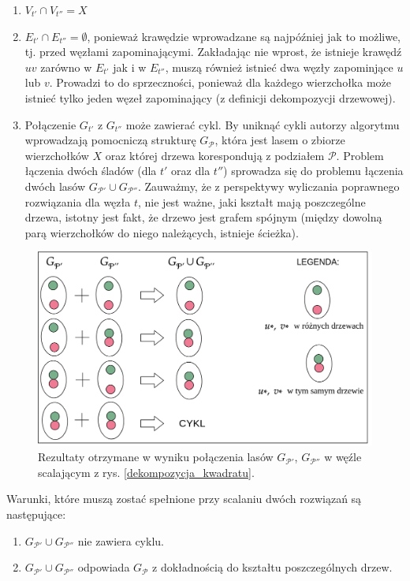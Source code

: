 \documentclass[12pt, oneside]{report}
\begin{document}
\begin{enumerate}[label=(\alph*)]
\item $V_{t'} \cap V_{t''} = X$
\item $E_{t'} \cap E_{t''} = \emptyset$, ponieważ krawędzie wprowadzane są najpóźniej jak to możliwe, tj. przed węzłami zapominającymi. Zakładając nie wprost, że istnieje krawędź $uv$ zarówno w $E_{t'}$ jak i w $E_{t''}$, muszą również istnieć dwa węzły zapominjące $u$ lub $v$. Prowadzi to do sprzeczności, ponieważ dla każdego wierzchołka może istnieć tylko jeden węzeł zapominający (z definicji dekompozycji drzewowej).
\item Połączenie $G_{t'}$ z $G_{t''}$ może zawierać cykl. By uniknąć cykli autorzy algorytmu wprowadzają pomocniczą strukturę $G_{\mathcal{P}}$, która jest lasem o zbiorze wierzchołków $X$ oraz której drzewa korespondują z podziałem $\mathcal{P}$. Problem łączenia dwóch śladów (dla $t'$ oraz dla $t''$) sprowadza się do problemu łączenia dwóch lasów $G_{\mathcal{P}'} \cup G_{\mathcal{P}''}$. Zauważmy, że z perspektywy wyliczania poprawnego rozwiązania dla węzła $t$, nie jest ważne, jaki kształt mają poszczególne drzewa, istotny jest fakt, że drzewo jest grafem spójnym (między dowolną parą wierzchołków do niego należących, istnieje ścieżka).
\end{enumerate}

\begin{figure}
\centering
\includegraphics[width=16cm]{find_n_union.png}
\caption{Rezultaty otrzymane w wyniku połączenia lasów $G_{\mathcal{P}'}$, $G_{\mathcal{P}''}$ w węźle scalającym z rys. \ref{dekompozycja_kwadratu}.}
\label{find_n_union}
\end{figure}

$$$$Warunki, które muszą zostać spełnione przy scalaniu dwóch rozwiązań są następujące:
\begin{enumerate}[label=(\roman*)]
\item $G_{\mathcal{P}'} \cup G_{\mathcal{P}''}$ nie zawiera cyklu.
\item $G_{\mathcal{P}'} \cup G_{\mathcal{P}''}$ odpowiada $G_{\mathcal{P}}$ z dokładnością do kształtu poszczególnych drzew. 
\end{enumerate}
\end{document}
